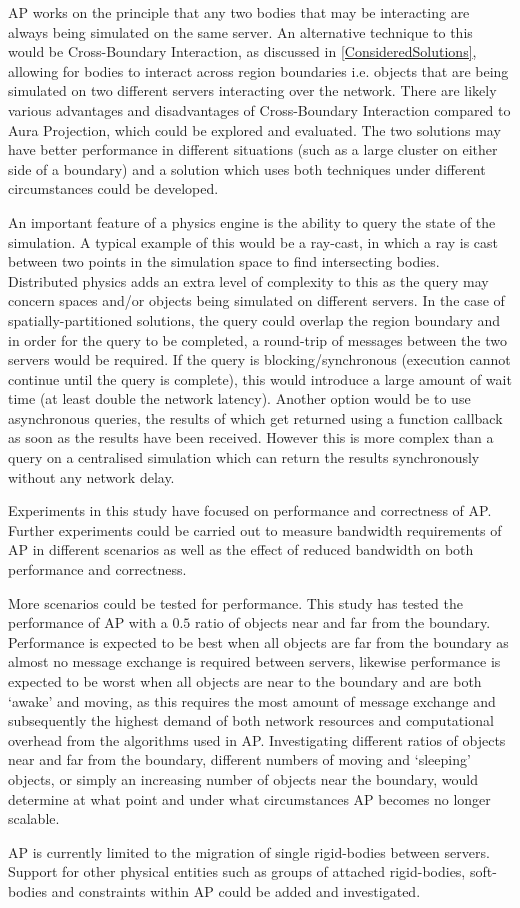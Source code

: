 
AP works on the principle that any two bodies that may be interacting are always being simulated on the same server. An alternative technique to this would be Cross-Boundary Interaction, as discussed in \ref{ConsideredSolutions}, allowing for bodies to interact across region boundaries i.e. objects that are being simulated on two different servers interacting over the network. There are likely various advantages and disadvantages of Cross-Boundary Interaction compared to Aura Projection, which could be explored and evaluated. The two solutions may have better performance in different situations (such as a large cluster on either side of a boundary) and a solution which uses both techniques under different circumstances could be developed.

An important feature of a physics engine is the ability to query the state of the simulation. A typical example of this would be a ray-cast, in which a ray is cast between two points in the simulation space to find intersecting bodies. %
Distributed physics adds an extra level of complexity to this as the query may concern spaces and/or objects being simulated on different servers. In the case of spatially-partitioned solutions, the query could overlap the region boundary and in order for the query to be completed, a round-trip of messages between the two servers would be required. If the query is blocking/synchronous (execution cannot continue until the query is complete), this would introduce a large amount of wait time (at least double the network latency). Another option would be to use asynchronous queries, the results of which get returned using a function callback as soon as the results have been received. However this is more complex than a query on a centralised simulation which can return the results synchronously without any network delay.

Experiments in this study have focused on performance and correctness of AP. Further experiments could be carried out to measure bandwidth requirements of AP in different scenarios as well as the effect of reduced bandwidth on both performance and correctness.

More scenarios could be tested for performance. This study has tested the performance of AP with a $0.5$ ratio of objects near and far from the boundary. Performance is expected to be best when all objects are far from the boundary as almost no message exchange is required between servers, likewise performance is expected to be worst when all objects are near to the boundary and are both `awake' and moving, as this requires the most amount of message exchange and subsequently the highest demand of both network resources and computational overhead from the algorithms used in AP. Investigating different ratios of objects near and far from the boundary, different numbers of moving and `sleeping' objects, or simply an increasing number of objects near the boundary, would determine at what point and under what circumstances AP becomes no longer scalable.

AP is currently limited to the migration of single rigid-bodies between servers. Support for other physical entities such as groups of attached rigid-bodies, soft-bodies and constraints within AP could be added and investigated.

